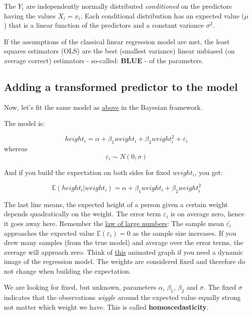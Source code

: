 \documentclass[
]{book}
\begin{document}
The \(Y_i\) are independently normally distributed \emph{conditioned} on the predictors
having the values \(X_i = x_i\). Each conditional distribution has an expected value (\(\mu\))
that is a linear function of the predictors and a constant variance \(\sigma^2\).

If the assumptions of the classical linear regression model are met, the least squares
estimators (OLS) are the best (smallest variance) linear unbiased (on average correct) estimators
- so-called: \textbf{BLUE} - of the parameters.

\subsection{Adding a transformed predictor to the model}\label{adding_transformed_predictor_freq}

Now, let's fit the same model as \hyperref[adding_transformed_predictor_bayes]{above} in the Bayesian framework.

The model is:

\[height_i = \alpha + \beta_1 weight_i + \beta_2 weight_i^2 + \varepsilon_i\]
whereas
\[\varepsilon_i \sim N(0, \sigma)\]

And if you build the expectation on both sides for fixed \(weight_i\), you get:

\[\mathbb{E}(height_i|weight_i) = \alpha + \beta_1 weight_i + \beta_2 weight_i^2\]

The last line means, the expected height of a person given a certain weight depends
quadratically on the weight. The error term \(\varepsilon_i\) is on average zero, hence it goes away here.
Remember the \href{https://en.wikipedia.org/wiki/Law_of_large_numbers\#Weak_law}{law of large numbers}:
The sample mean \(\bar{\varepsilon_i}\) approaches the expected value \(\mathbb{E}(\varepsilon_i)=0\)
as the sample size increases. If you drew many samples (from the true model)
and average over the error terms, the average will approach zero.
Think of \href{https://github.com/jdegenfellner/ZHAW_Teaching/blob/main/Wiggle_in_simple_linear_regression.R}{this} animated
graph if you need a dynamic image of the regression model.
The weights are considered fixed and therefore do not change when building the expectation.

We are looking for fixed, but unknown, parameters \(\alpha\), \(\beta_1\), \(\beta_2\) and \(\sigma\).
The fixed \(\sigma\) indicates that the observations \emph{wiggle} around the expected value
equally strong not matter which weight we have. This is called \textbf{homoscedasticity}.
\end{document}
